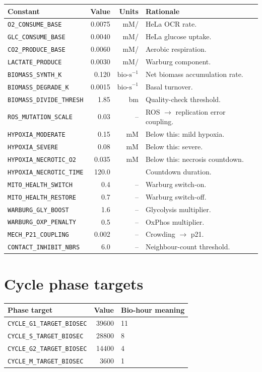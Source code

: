 \documentclass[11pt,letterpaper,twoside,openany]{book}
\newcommand{\code}[1]{\texttt{#1}}
\newcommand{\bioh}{\text{bio-h}}
\newcommand{\biosec}{\text{bio-s}}
\begin{document}
\begin{longtable}{p{4.6cm}rrp{6.0cm}}
\toprule
\textbf{Constant} & \textbf{Value} & \textbf{Units} & \textbf{Rationale}\\ \midrule
\code{O2\_CONSUME\_BASE}    & 0.0075 & mM/\biosec & HeLa OCR rate.\\
\code{GLC\_CONSUME\_BASE}   & 0.0040 & mM/\biosec & HeLa glucose uptake.\\
\code{CO2\_PRODUCE\_BASE}   & 0.0060 & mM/\biosec & Aerobic respiration.\\
\code{LACTATE\_PRODUCE}     & 0.0030 & mM/\biosec & Warburg component.\\
\code{BIOMASS\_SYNTH\_K}    & 0.120  & $\biosec^{-1}$ & Net biomass accumulation rate.\\
\code{BIOMASS\_DEGRADE\_K}  & 0.0015 & $\biosec^{-1}$ & Basal turnover.\\
\code{BIOMASS\_DIVIDE\_THRESH} & 1.85 & bm & Quality-check threshold.\\
\code{ROS\_MUTATION\_SCALE} & 0.03 & -- & ROS $\to$ replication error coupling.\\
\code{HYPOXIA\_MODERATE}    & 0.15 & mM & Below this: mild hypoxia.\\
\code{HYPOXIA\_SEVERE}      & 0.08 & mM & Below this: severe.\\
\code{HYPOXIA\_NECROTIC\_O2}& 0.035& mM & Below this: necrosis countdown.\\
\code{HYPOXIA\_NECROTIC\_TIME}& 120.0 & \biosec & Countdown duration.\\
\code{MITO\_HEALTH\_SWITCH} & 0.4 & -- & Warburg switch-on.\\
\code{MITO\_HEALTH\_RESTORE}& 0.7 & -- & Warburg switch-off.\\
\code{WARBURG\_GLY\_BOOST}  & 1.6 & -- & Glycolysis multiplier.\\
\code{WARBURG\_OXP\_PENALTY}& 0.5 & -- & OxPhos multiplier.\\
\code{MECH\_P21\_COUPLING}  & 0.002 & -- & Crowding $\to$ p21.\\
\code{CONTACT\_INHIBIT\_NBRS} & 6.0 & -- & Neighbour-count threshold.\\
\bottomrule
\end{longtable}

\section{Cycle phase targets}

\begin{longtable}{p{4.6cm}rp{5.0cm}}
\toprule
Phase target & Value & Bio-hour meaning\\ \midrule
\code{CYCLE\_G1\_TARGET\_BIOSEC} & 39600 & 11\,\bioh\\
\code{CYCLE\_S\_TARGET\_BIOSEC}  & 28800 &  8\,\bioh\\
\code{CYCLE\_G2\_TARGET\_BIOSEC} & 14400 &  4\,\bioh\\
\code{CYCLE\_M\_TARGET\_BIOSEC}  &  3600 &  1\,\bioh\\
\bottomrule
\end{longtable}
\end{document}
